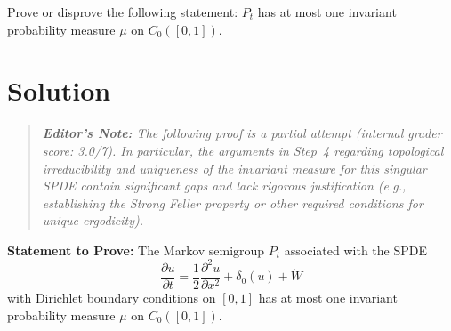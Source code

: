 \documentclass[12pt]{article}
\begin{document}
Prove or disprove the following statement:  $P_t$ has at most one invariant probability measure $\mu$ on $C_0([0,1])$.

\section*{Solution}

\begin{quote}
\small \emph{\textbf{Editor's Note:} The following proof is a partial attempt (internal grader score: 3.0/7). In particular, the arguments in Step~4 regarding topological irreducibility and uniqueness of the invariant measure for this singular SPDE contain significant gaps and lack rigorous justification (e.g., establishing the Strong Feller property or other required conditions for unique ergodicity).}
\end{quote}

\noindent\textbf{Statement to Prove:} The Markov semigroup $P_t$ associated with the SPDE 
\[ \frac{\partial u}{\partial t} = \frac{1}{2} \frac{\partial^2 u}{\partial x^2} + \delta_0(u) +  \dot{W} \]
with Dirichlet boundary conditions on $[0,1]$ has at most one invariant probability measure $\mu$ on $C_0([0,1])$.
\end{document}
